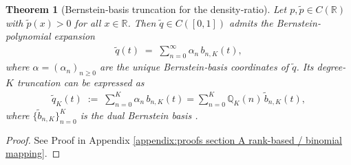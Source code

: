 \documentclass{article}
\newtheorem{theorem}{Theorem}[section]
\begin{document}
\begin{theorem}[Bernstein‐basis truncation for the density‐ratio]
\label{thm:bernstein_truncation_ratio}
Let \(p,\tilde p\in C(\mathbb{R})\) with \(\tilde p(x)>0\) for all $x\in \mathbb{R}$. Then \(\tilde{q}\in C([0,1])\) admits the Bernstein‐polynomial expansion
\begin{align*}
\tilde q(t)
\;=\;
\sum_{n=0}^{\infty}\alpha_{n}\,b_{n,K}(t),
\end{align*}
where \(\alpha=(\alpha_n)_{n\ge0}\) are the unique Bernstein‐basis coordinates of \(\tilde q\). Its degree-\(K\) truncation can be expressed as
\begin{align*}
\tilde{q}_{K}(t)
\;:=\;
\sum_{n=0}^{K}\alpha_{n}\,b_{n,K}(t) = \sum_{n=0}^{K} \mathbb{Q}_{K}(n) \, \tilde{b}_{n,K}(t),
\end{align*}
where \(\{\tilde b_{n,K}\}_{n=0}^K\) is the dual Bernstein basis \cite{jiittler1998dual}.
\end{theorem}
\begin{proof}
    See Proof in Appendix \ref{appendix:proofs section A rank-based / binomial mapping}.
\end{proof}

\end{document}
